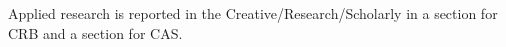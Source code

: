 Applied research is reported  in the Creative/Research/Scholarly in a section for CRB and a section for CAS.
\begin{comment}
\paragraph{Plans for 15JUN21-14JUN22}

I plan to continue providing control recommendations for invasive insect species when control methods are available.

I will continue with applied research on CAS and CRB in an effort to mitigate the major damage being done by these pests.

\paragraph{Plans for 15JUN22-14JUN23}

I plan to continue providing control recommendations for invasive insect species when control methods are available.

I will continue with applied research on CAS and CRB in an effort to mitigate the major damage being done by these pests.
\end{comment}
